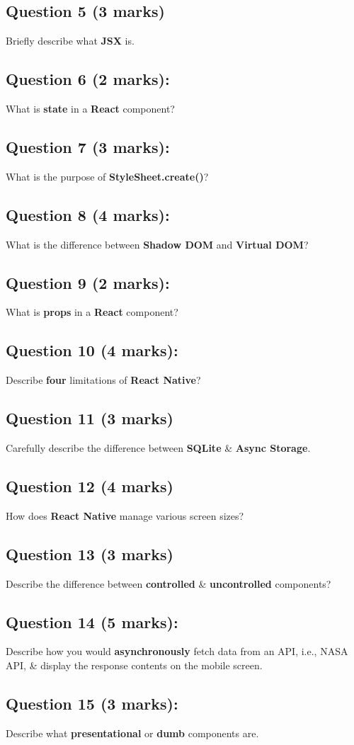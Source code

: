 \documentclass{article}
\begin{document}
\subsection*{Question 5 (3 marks)}
Briefly describe what \textbf{JSX} is.

\subsection*{Question 6 (2 marks):}
What is \textbf{state} in a \textbf{React} component?

\subsection*{Question 7 (3 marks):}
What is the purpose of \textbf{StyleSheet.create()}?

\subsection*{Question 8 (4 marks):}
What is the difference between \textbf{Shadow DOM} and \textbf{Virtual DOM}?

\subsection*{Question 9 (2 marks):}
What is \textbf{props} in a \textbf{React} component?

\subsection*{Question 10 (4 marks):}
Describe \textbf{four} limitations of \textbf{React Native}?

\subsection*{Question 11 (3 marks)}
Carefully describe the difference between \textbf{SQLite} \& \textbf{Async Storage}.

\subsection*{Question 12 (4 marks)}
How does \textbf{React Native} manage various screen sizes?

\subsection*{Question 13 (3 marks)}
Describe the difference between \textbf{controlled} \& \textbf{uncontrolled} components?

\subsection*{Question 14 (5 marks):}
Describe how you would \textbf{asynchronously} fetch data from an API, i.e., NASA API, \& display the response contents on the mobile screen.

\subsection*{Question 15 (3 marks):}
Describe what \textbf{presentational} or \textbf{dumb} components are.
\end{document}
